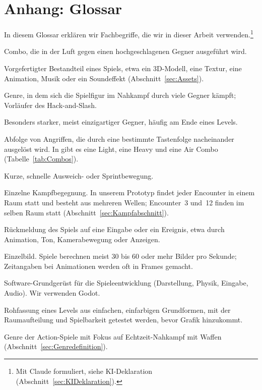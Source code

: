 \documentclass[../Main.tex]{subfiles}
\begin{document}
\newpage
\section{Anhang: Glossar} \label{sec:Glossar}

In diesem Glossar erklären wir Fachbegriffe, die wir in dieser Arbeit verwenden.\footnote{Mit Claude formuliert, siehe KI-Deklaration (Abschnitt~\ref{sec:KIDeklaration}).}

\begin{description}[style=unboxed, leftmargin=0cm, itemsep=0.3em]
\item[Air Combo] Combo, die in der Luft gegen einen hochgeschlagenen Gegner ausgeführt wird.
\item[Asset] Vorgefertigter Bestandteil eines Spiels, etwa ein 3D-Modell, eine Textur, eine Animation, Musik oder ein Soundeffekt (Abschnitt~\ref{sec:Assets}).
\item[Beat 'em up] Genre, in dem sich die Spielfigur im Nahkampf durch viele Gegner kämpft; Vorläufer des Hack-and-Slash.
\item[Bossgegner] Besonders starker, meist einzigartiger Gegner, häufig am Ende eines Levels.
\item[Combo] Abfolge von Angriffen, die durch eine bestimmte Tastenfolge nacheinander ausgelöst wird. In  gibt es eine Light, eine Heavy und eine Air Combo (Tabelle~\ref{tab:Combos}).
\item[Dash] Kurze, schnelle Ausweich- oder Sprintbewegung.
\item[Encounter] Einzelne Kampfbegegnung. In unserem Prototyp findet jeder Encounter in einem Raum statt und besteht aus mehreren Wellen; Encounter~3 und~12 finden im selben Raum statt (Abschnitt~\ref{sec:Kampfabschnitt}).
\item[Feedback] Rückmeldung des Spiels auf eine Eingabe oder ein Ereignis, etwa durch Animation, Ton, Kamerabewegung oder Anzeigen.
\item[Frame] Einzelbild. Spiele berechnen meist 30 bis 60 oder mehr Bilder pro Sekunde; Zeitangaben bei Animationen werden oft in Frames gemacht.
\item[Game Engine] Software-Grundgerüst für die Spieleentwicklung (Darstellung, Physik, Eingabe, Audio). Wir verwenden Godot.
\item[Greybox] Rohfassung eines Levels aus einfachen, einfarbigen Grundformen, mit der Raumaufteilung und Spielbarkeit getestet werden, bevor Grafik hinzukommt.
\item[Hack-and-Slash] Genre der Action-Spiele mit Fokus auf Echtzeit-Nahkampf mit Waffen (Abschnitt~\ref{sec:Genredefinition}).

\end{description}
\end{document}

